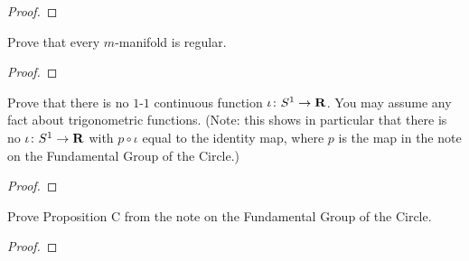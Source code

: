 \begin{proof}
\end{proof}
\newpage
\begin{problem}[(B)]
Prove that every $m$-manifold is regular.
\end{problem}
\begin{proof}
\end{proof}
\newpage
\begin{problem}[(C)]
Prove that there is no $1$-$1$ continuous function $\iota\colon
S^1\to\mathbf{R}$. You may assume any fact about trigonometric
functions. (Note: this shows in particular that there is no
$\iota\colon S^1\to\mathbf{R}$ with $p\circ\iota$ equal to the identity
map, where $p$ is the map in the note on the Fundamental Group of
the Circle.)
\end{problem}
\begin{proof}
\end{proof}
\newpage
\begin{problem}[(D)]
Prove Proposition C from the note on the Fundamental Group of the Circle.
\end{problem}
\begin{proof}
\end{proof}

